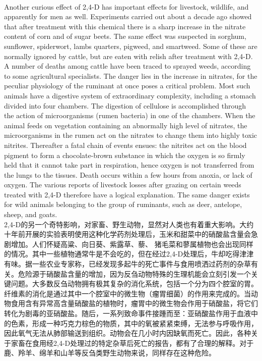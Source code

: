 \documentclass{article}
\begin{document}
\\
Another curious effect of 2,4-D has important effects for livestock, wildlife, and apparently for men as well. Experiments carried out about a decade ago showed that after treatment with this chemical there is a sharp increase in the nitrate content of corn and of sugar beets. The same effect was suspected in sorghum, sunflower, spiderwort, lambs quarters, pigweed, and smartweed. Some of these are normally ignored by cattle, but are eaten with relish after treatment with 2,4-D. A number of deaths among cattle have been traced to sprayed weeds, according to some agricultural specialists. The danger lies in the increase in nitrates, for the peculiar physiology of the ruminant at once poses a critical problem. Most such animals have a digestive system of extraordinary complexity, including a stomach divided into four chambers. The digestion of cellulose is accomplished through the action of microorganisms (rumen bacteria) in one of the chambers. When the animal feeds on vegetation containing an abnormally high level of nitrates, the microorganisms in the rumen act on the nitrates to change them into highly toxic nitrites. Thereafter a fatal chain of events ensues: the nitrites act on the blood pigment to form a chocolate-brown substance in which the oxygen is so firmly held that it cannot take part in respiration, hence oxygen is not transferred from the lungs to the tissues. Death occurs within a few hours from anoxia, or lack of oxygen. The various reports of livestock losses after grazing on certain weeds treated with 2,4-D therefore have a logical explanation. The same danger exists for wild animals belonging to the group of ruminants, such as deer, antelope, sheep, and goats.\\
2,4-D的另一个奇特影响，对家畜、野生动物，显然对人类也有着重大影响。大约十年前开展的实验表明使用这种化学药剂处理后，玉米和甜菜中的硝酸盐含量会急剧增加。人们怀疑高粱、向日葵、紫露草、藜、 猪毛菜和蓼属植物也会出现同样的情况。其中一些植物通常牛是不会吃的，但在经过2,4-D处理后，牛却吃得津津有味。据一些农业专家称，已经发现多起牛的死亡事件与食用喷洒过药剂的杂草有关。危险源于硝酸盐含量的增加，因为反刍动物特殊的生理机能会立刻引发一个关键问题。大多数反刍动物拥有极其复杂的消化系统，包括一个分为四个腔室的胃。纤维素的消化是通过其中一个腔室中的微生物（瘤胃细菌）的作用来完成的。当动物食用含有异常高含量硝酸盐的植物时，瘤胃中的微生物会作用于硝酸盐，将它们转化为剧毒的亚硝酸盐。随后，一系列致命事件接踵而至：亚硝酸盐作用于血液中的色素，形成一种巧克力棕色的物质，其中的氧被紧紧束缚，无法参与呼吸作用，因此氧气无法从肺部输送到组织。动物会在几小时内因缺氧而死亡。因此，各种关于家畜在食用经2,4-D处理过的特定杂草后死亡的报告，都有了合理的解释。对于鹿、羚羊、绵羊和山羊等反刍类野生动物来说，同样存在这种危险。 \\
\end{document}
